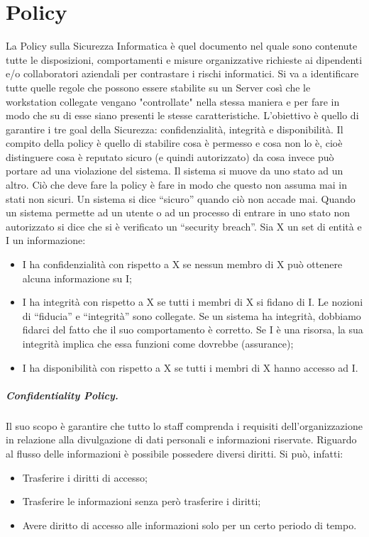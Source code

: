 
\chapter {Policy}

La Policy sulla Sicurezza Informatica è quel documento nel quale sono
contenute tutte le
disposizioni, comportamenti e misure organizzative richieste ai dipendenti
e/o collaboratori
aziendali per contrastare i rischi informatici. Si va a identificare tutte
quelle regole che possono
essere stabilite su un Server così che le workstation collegate vengano
"controllate" nella stessa
maniera e per fare in modo che su di esse siano presenti le stesse
caratteristiche.
L’obiettivo è quello di garantire i tre goal della Sicurezza:
confidenzialità, integrità e disponibilità.
Il compito della policy è quello di stabilire cosa è permesso e cosa non
lo è, cioè distinguere cosa è
reputato sicuro (e quindi autorizzato) da cosa invece può portare ad una
violazione del sistema. Il
sistema si muove da uno stato ad un altro. Ciò che deve fare la policy è
fare in modo che questo
non assuma mai in stati non sicuri. Un sistema si dice “sicuro” quando ciò
non accade mai.
Quando un sistema permette ad un utente o ad un processo di entrare in uno
stato non autorizzato
si dice che si è verificato un “security breach”.
Sia X un set di entità e I un informazione:
\begin{itemize}
      \item I ha confidenzialità con rispetto a X se nessun membro di X può
            ottenere alcuna
            informazione su I;
      \item I ha integrità con rispetto a X se tutti i membri di X si fidano
            di I. Le nozioni di “fiducia” e
            “integrità” sono collegate. Se un sistema ha integrità, dobbiamo
            fidarci del fatto che il suo
            comportamento è corretto. Se I è una risorsa, la sua integrità implica
            che essa funzioni
            come dovrebbe (assurance);
      \item I ha disponibilità con rispetto a X se tutti i membri di X hanno
            accesso ad I.
\end{itemize}


\paragraph{Confidentiality Policy.}

Il suo scopo è garantire che tutto lo staff comprenda i requisiti
dell'organizzazione in relazione alla
divulgazione di dati personali e informazioni riservate.
Riguardo al flusso delle informazioni è possibile possedere diversi
diritti. Si può, infatti:
\begin{itemize}
      \item Trasferire i diritti di accesso;
      \item Trasferire le informazioni senza però trasferire i diritti;
      \item Avere diritto di accesso alle informazioni solo per un certo
            periodo di tempo.
\end{itemize}

